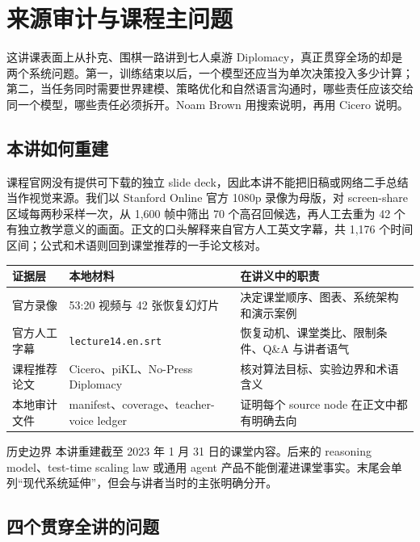\section{来源审计与课程主问题}

这讲课表面上从扑克、围棋一路讲到七人桌游 Diplomacy，真正贯穿全场的却是两个系统问题。第一，训练结束以后，一个模型还应当为单次决策投入多少计算；第二，当任务同时需要世界建模、策略优化和自然语言沟通时，哪些责任应该交给同一个模型，哪些责任必须拆开。Noam Brown 用搜索说明，再用 Cicero 说明。

\subsection{本讲如何重建}

课程官网没有提供可下载的独立 slide deck，因此本讲不能把旧稿或网络二手总结当作视觉来源。我们以 Stanford Online 官方 1080p 录像为母版，对 screen-share 区域每两秒采样一次，从 1,600 帧中筛出 70 个高召回候选，再人工去重为 42 个有独立教学意义的画面。正文的口头解释来自官方人工英文字幕，共 1,176 个时间区间；公式和术语则回到课堂推荐的一手论文核对。

\begin{longtable}{L{0.22\textwidth}L{0.31\textwidth}L{0.37\textwidth}}
\toprule
证据层 & 本地材料 & 在讲义中的职责 \\
\midrule
官方录像 & 53:20 视频与 42 张恢复幻灯片 & 决定课堂顺序、图表、系统架构和演示案例 \\
官方人工字幕 & \texttt{lecture14.en.srt} & 恢复动机、课堂类比、限制条件、Q\&A 与讲者语气 \\
课程推荐论文 & Cicero、piKL、No-Press Diplomacy & 核对算法目标、实验边界和术语含义 \\
本地审计文件 & manifest、coverage、teacher-voice ledger & 证明每个 source node 在正文中都有明确去向 \\
\bottomrule
\end{longtable}

\begin{warningbox}{历史边界}
本讲重建截至 2023 年 1 月 31 日的课堂内容。后来的 reasoning model、test-time scaling law 或通用 agent 产品不能倒灌进课堂事实。末尾会单列“现代系统延伸”，但会与讲者当时的主张明确分开。
\end{warningbox}

\subsection{四个贯穿全讲的问题}


